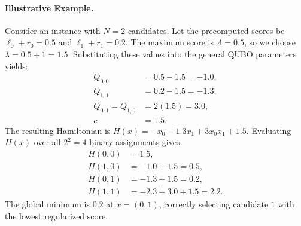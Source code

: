 \documentclass[12pt]{article}
\begin{document}
\paragraph{Illustrative Example.}
Consider an instance with $N=2$ candidates. Let the precomputed scores be $\ell_0 + r_0 = 0.5$ and $\ell_1 + r_1 = 0.2$. The maximum score is $\Lambda = 0.5$, so we choose $\lambda = 0.5 + 1 = 1.5$. Substituting these values into the general QUBO parameters yields:
\begin{align}
Q_{0,0} &= 0.5 - 1.5 = -1.0, \\
Q_{1,1} &= 0.2 - 1.5 = -1.3, \\
Q_{0,1} = Q_{1,0} &= 2(1.5) = 3.0, \\
c &= 1.5.
\end{align}
The resulting Hamiltonian is $H(x) = -x_0 - 1.3x_1 + 3x_0x_1 + 1.5$. Evaluating $H(x)$ over all $2^2 = 4$ binary assignments gives:
\begin{align}
H(0,0) &= 1.5, \\
H(1,0) &= -1.0 + 1.5 = 0.5, \\
H(0,1) &= -1.3 + 1.5 = 0.2, \\
H(1,1) &= -2.3 + 3.0 + 1.5 = 2.2.
\end{align}
The global minimum is $0.2$ at $x = (0,1)$, correctly selecting candidate $1$ with the lowest regularized score.
\end{document}
